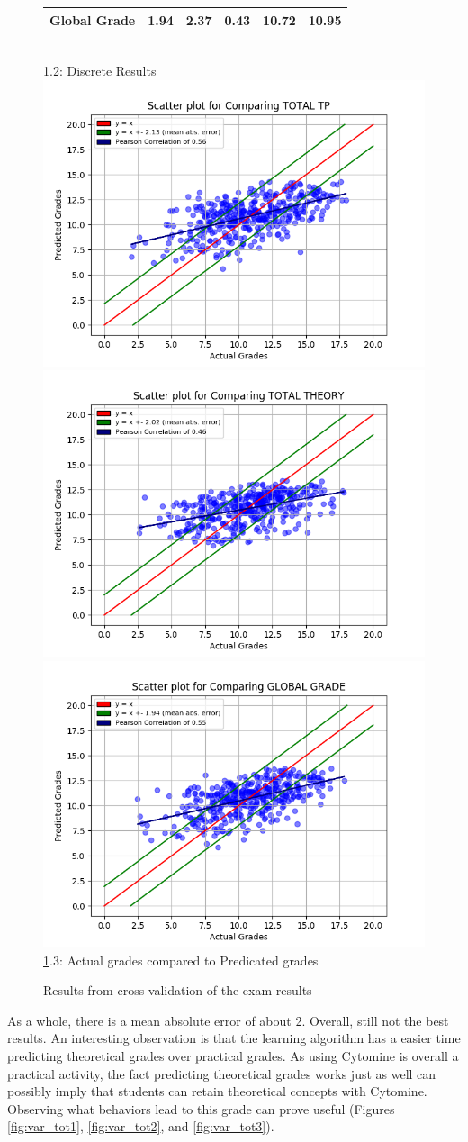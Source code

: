 \documentclass[a4paper,11pt]{report}
\numberwithin{figure}{chapter} %
\begin{document}
\begin{figure}[H]
\begin{tabular}{| l | c | c | c | c | c |}
      \tiny{Global Grade} & \tiny{1.94} & \tiny{2.37} & \tiny{0.43} & \tiny{10.72} & \tiny{10.95}\\
      \hline
      \end{tabular}\\
      \vspace{0.5cm}
      \ref{fig:results_tot}.2: Discrete Results\\
      \vspace{0.3cm}
      \includegraphics[width=.30\linewidth]{plots/cv_comp_TOTAL_TP_2018-04-27_19_24_46.png}
      \includegraphics[width=.30\linewidth]{plots/cv_comp_TOTAL_THEORY_2018-04-30_13_53_15.png}
  	  \includegraphics[width=.30\linewidth]{plots/cv_comp_GLOBAL_GRADE_2018-04-30_13_48_59.png}
      \\
      \ref{fig:results_tot}.3: Actual grades compared to Predicated grades
      \caption{Results from cross-validation of the exam results}
      \label{fig:results_tot}
    \end{figure}

    As a whole, there is a mean absolute error of about 2.
    Overall, still not the best results.
    An interesting observation is that the learning algorithm has a easier time predicting theoretical grades over practical grades.
    As using Cytomine is overall a practical activity, the fact predicting theoretical grades works just as well can possibly imply that students can retain theoretical concepts with Cytomine.\\

    Observing what behaviors lead to this grade can prove useful (Figures \ref{fig:var_tot1}, \ref{fig:var_tot2}, and \ref{fig:var_tot3}).
\end{document}

